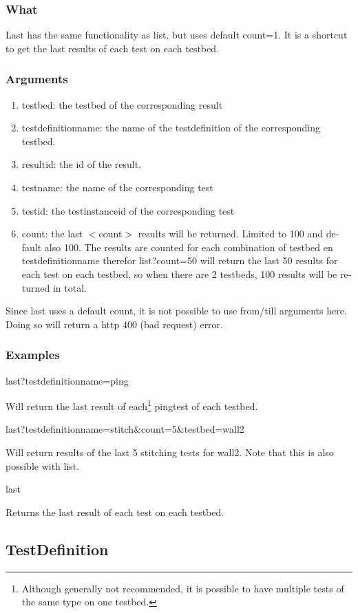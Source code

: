 \begin{otherlanguage}{english}
\subsubsection{What}
Last has the same functionality as list, but uses default count=1. It is a shortcut to get the last results of each test on each testbed.
\subsubsection{Arguments}
\begin{enumerate}
\item testbed: the testbed of the corresponding result
\item testdefinitionname: the name of the testdefinition of the corresponding testbed.
\item resultid: the id of the result.
\item testname: the name of the corresponding test
\item testid: the testinstanceid of the corresponding test
\item count: the last $<$count$>$ results will be returned. Limited to 100 and default also 100. The results are counted for each combination of testbed en testdefinitionname therefor list?count=50 will return the last 50 results for each test on each testbed, so when there are 2 testbeds, 100 results will be returned in total.
\end{enumerate}
\npar
Since last uses a default count, it is not possible to use from/till arguments here. Doing so will return a http 400 (bad request) error.
\subsubsection{Examples}
\begin{lt}
last?testdefinitionname=ping
\end{lt}
Will return the last result of each\footnote{Although generally not recommended, it is possible to have multiple tests of the same type on one testbed.} pingtest of each testbed.
\npar
\begin{lt}
last?testdefinitionname=stitch&count=5&testbed=wall2
\end{lt}
Will return results of the last 5 stitching tests for wall2. Note that this is also possible with list.
\npar
\begin{lt}
last
\end{lt}
Returns the last result of each test on each testbed.
\clearpage
\subsection{TestDefinition}

\end{otherlanguage}
